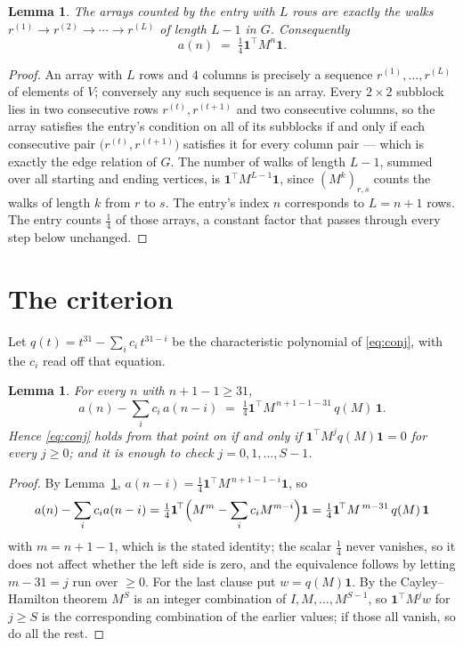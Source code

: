 \documentclass[11pt,a4paper]{article}
\theoremstyle{plain}
\newtheorem{lemma}[theorem]{Lemma}
\theoremstyle{definition}
\begin{document}
\begin{lemma}\label{lem:walk}
The arrays counted by the entry with $L$ rows are exactly the walks
$r^{(1)}\to r^{(2)}\to\cdots\to r^{(L)}$ of length $L-1$ in $G$. Consequently
\[
a(n)\;=\;\tfrac1{4}\mathbf{1}^{\!\top}M^{n}\mathbf{1} .
\]
\end{lemma}

\begin{proof}
An array with $L$ rows and $4$ columns is precisely a sequence
$r^{(1)},\dots,r^{(L)}$ of elements of $V$; conversely any such sequence is an array.
Every $2\times2$ subblock lies in two consecutive rows $r^{(t)},r^{(t+1)}$ and two
consecutive columns, so the array satisfies the entry's condition on all of its subblocks
if and only if each consecutive pair $\bigl(r^{(t)},r^{(t+1)}\bigr)$ satisfies it for
every column pair --- which is exactly the edge relation of $G$. The number of walks of
length $L-1$, summed over all starting and ending vertices, is
$\mathbf{1}^{\!\top}M^{L-1}\mathbf{1}$, since $(M^{k})_{r,s}$ counts the walks of
length $k$ from $r$ to $s$. The entry's index $n$ corresponds to $L=n+1$ rows. The entry counts $\tfrac1{4}$ of those arrays, a constant factor that passes through every step below unchanged.
\end{proof}

\section{The criterion}

Let $q(t)=t^{31}-\sum_i c_i\,t^{31-i}$ be the characteristic polynomial of
\eqref{eq:conj}, with the $c_i$ read off that equation.

\begin{lemma}\label{lem:crit}
For every $n$ with $n+1-1\ge31$,
\[
a(n)-\sum_i c_i\,a(n-i)\;=\;\tfrac1{4}\mathbf{1}^{\!\top}M^{\,n+1-1-31}\,q(M)\,\mathbf{1} .
\]
Hence \eqref{eq:conj} holds from that point on if and only if
$\mathbf{1}^{\!\top}M^{j}q(M)\mathbf{1}=0$ for every $j\ge0$; and it is enough to check
$j=0,1,\dots,S-1$.
\end{lemma}

\begin{proof}
By Lemma~\ref{lem:walk}, $a(n-i)=\tfrac1{4}\mathbf{1}^{\!\top}M^{\,n+1-1-i}\mathbf{1}$, so
\[
a(n)-\sum_i c_i a(n-i)
=\tfrac1{4}\mathbf{1}^{\!\top}\Bigl(M^{m}-\sum_i c_i M^{m-i}\Bigr)\mathbf{1}
=\tfrac1{4}\mathbf{1}^{\!\top}M^{\,m-31}\,q(M)\,\mathbf{1}
\]
with $m=n+1-1$, which is the stated identity; the scalar $\tfrac1{4}$ never vanishes, so it does not affect whether the left side is zero, and the equivalence follows by letting
$m-31=j$ run over $\ge0$. For the last clause put $w=q(M)\mathbf{1}$. By the
Cayley--Hamilton theorem $M^{S}$ is an integer combination of $I,M,\dots,M^{S-1}$, so
$\mathbf{1}^{\!\top}M^{j}w$ for $j\ge S$ is the corresponding combination of the earlier
values; if those all vanish, so do all the rest.
\end{proof}
\end{document}
